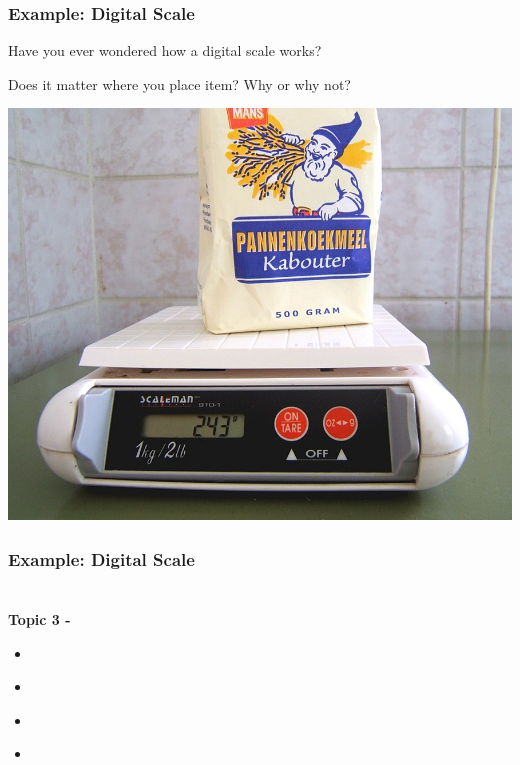 \documentclass[fleqn]{beamer} %
\newcommand{\sectionIIItitle}{}
\newcommand{\sectionIIsubsectionIVtitle}{Example: Digital Scale}
\newcommand{\sectionIIIsubsectionItitle}{}
\newcommand{\sectionIIIsubsectionIItitle}{}
\newcommand{\sectionIIIsubsectionIIItitle}{}
\newcommand{\sectionIIIsubsectionIVtitle}{}
\begin{document}
			\begin{frame}
				\frametitle{\sectionIIsubsectionIVtitle}

				\begin{multicols}{2}
Have you ever wondered how a digital scale works? \vspcc

Does it matter where you place item? Why or why not?

\includegraphics[scale=.2]{images/digital_scale.jpg}
\end{multicols}

			\end{frame}

			\begin{frame}
				\frametitle{\sectionIIsubsectionIVtitle}


			\end{frame}
		
	\section{\sectionIIItitle}\label{sectionIII}

		\begin{frame}
			\large \textbf{Topic 3 - \sectionIIItitle} \vspace{3mm}\\

			\begin{itemize}
				\item \hyperlink{sectionIIIsubsectionI}{\sectionIIIsubsectionItitle} \vspc %
				\item \hyperlink{sectionIIIsubsectionII}{\sectionIIIsubsectionIItitle} \vspc %
				\item \hyperlink{sectionIIIsubsectionIII}{\sectionIIIsubsectionIIItitle} \vspc %
				\item \hyperlink{sectionIIIsubsectionIV}{\sectionIIIsubsectionIVtitle} \vspc %
			\end{itemize}

		\end{frame}
\end{document}
